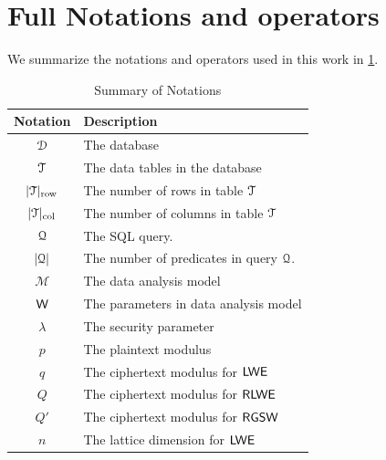 \appendix
\renewcommand{\tablename}{Appendix Table}
\setcounter{table}{0}
\renewcommand{\thetable}{A\arabic{table}}
\renewcommand{\tablename}{Appendix Table}
\setcounter{algorithm}{0}
\renewcommand{\thealgorithm}{A\arabic{algorithm}}
\renewcommand{\figurename}{Appendix Figure}
\setcounter{figure}{0}
\renewcommand{\thefigure}{A\arabic{figure}}
\setcounter{equation}{0}
\renewcommand{\theequation}{A\arabic{equation}}
\section{Full Notations and operators}
We summarize the notations and operators used
in this work in \cref{tab: notations}.

\begin{table}[t!] 
   \begin{center}
   \vspace{-0em}
       \caption{Summary of Notations}\label{tab: notations}
       \vspace{-0em}
     \begin{tabular}{c|l}
        \toprule[1.0pt]
        Notation & Description \\
        \midrule
        $\mathcal{D}$ &  The database \\
        $\mathcal{T}$ &  The data tables in the database \\
        $|\mathcal{T}|_{\rm row}$ & The number of rows in table $\mathcal{T}$ \\
        $|\mathcal{T}|_{\rm col}$ & The number of columns in table $\mathcal{T}$ \\
        $\mathcal{Q}$  & The SQL query.\\
        $\lvert {\mathcal{Q}} \rvert$  & The number of predicates in query $\mathcal{Q}$.\\
        $\mathcal{M}$ &  The data analysis model\\
        $\mathsf{W}$ & The parameters in data analysis model \\
        \midrule
        $\lambda$ & The security parameter\\
        $p$       & The plaintext modulus \\
        $q$       & The ciphertext modulus for ${\mathsf{LWE}}$\\
        $Q$       & The ciphertext modulus for ${\mathsf{RLWE}}$\\
        $Q'$       & The ciphertext modulus for ${\mathsf{RGSW}}$\\
        $n$       & The lattice dimension for ${\mathsf{LWE}}$\\

\end{tabular}
\end{center}
\end{table}
